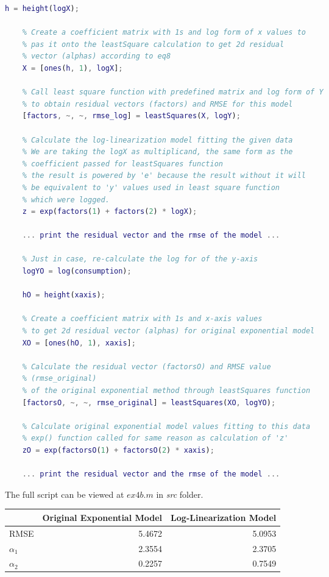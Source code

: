 \documentclass[unicode,11pt,a4paper,oneside,numbers=endperiod,openany]{scrartcl}
\begin{document}
\begin{enumerate}[label=(\alph*)]
\begin{lstlisting}[language=Matlab]
    h = height(logX);
    
    % Create a coefficient matrix with 1s and log form of x values to  
    % pas it onto the leastSquare calculation to get 2d residual 
    % vector (alphas) according to eq8
    X = [ones(h, 1), logX];
    
    % Call least square function with predefined matrix and log form of Y
    % to obtain residual vectors (factors) and RMSE for this model
    [factors, ~, ~, rmse_log] = leastSquares(X, logY);
    
    % Calculate the log-linearization model fitting the given data
    % We are taking the logX as multiplicand, the same form as the 
    % coefficient passed for leastSquares function
    % the result is powered by 'e' because the result without it will
    % be equivalent to 'y' values used in least square function
    % which were logged.
    z = exp(factors(1) + factors(2) * logX);
    
    ... print the residual vector and the rmse of the model ...
    
    % Just in case, re-calculate the log for of the y-axis
    logYO = log(consumption);

    hO = height(xaxis);
    
    % Create a coefficient matrix with 1s and x-axis values
    % to get 2d residual vector (alphas) for original exponential model
    XO = [ones(hO, 1), xaxis];
    
    % Calculate the residual vector (factorsO) and RMSE value
    % (rmse_original)
    % of the original exponential method through leastSquares function
    [factorsO, ~, ~, rmse_original] = leastSquares(XO, logYO);
    
    % Calculate original exponential model values fitting to this data
    % exp() function called for same reason as calculation of 'z'
    zO = exp(factorsO(1) + factorsO(2) * xaxis);
    
    ... print the residual vector and the rmse of the model ...
\end{lstlisting}

The full script can be viewed at ${ex4b.m}$ in \textit{src} folder. 

\begin{center}
\begin{tabular}{|l|r|r|} \hline
  & Original Exponential Model & Log-Linearization Model \\
\hline
  RMSE & 5.4672  & 5.0953 \\
\hline
  ${\alpha_1}$ & 2.3554 & 2.3705 \\
\hline
  ${\alpha_2}$ & 0.2257 & 0.7549 \\
\hline
\end{tabular}
\end{center}


\end{enumerate}
\end{document}

